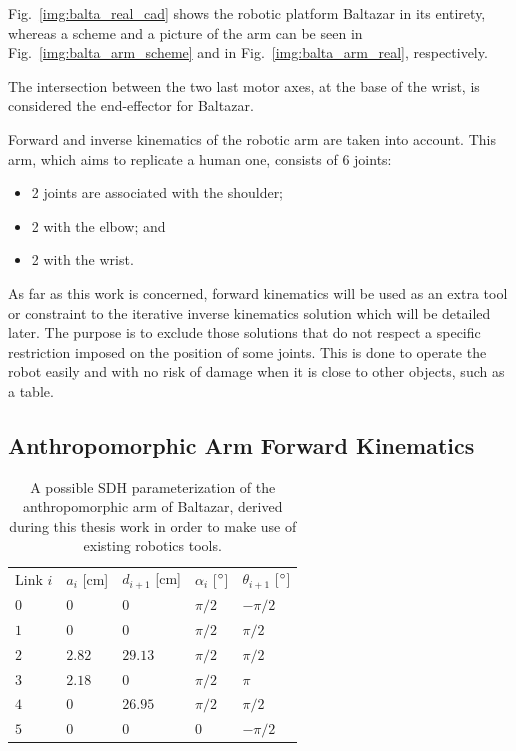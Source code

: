 Fig.~\ref{img:balta_real_cad} shows the robotic platform Baltazar in its entirety, whereas a scheme and a picture of the arm can be seen in Fig.~\ref{img:balta_arm_scheme} and in Fig.~\ref{img:balta_arm_real}, respectively.

\label{balta_ee}
The intersection between the two last motor axes, at the base of the wrist, is considered the end-effector for Baltazar.

Forward and inverse kinematics of the robotic arm are taken into account. This arm, which aims to replicate a human one, consists of 6 joints:
\begin{itemize}
\item 2 joints are associated with the shoulder;

\item 2 with the elbow; and

\item 2 with the wrist.
\end{itemize}

As far as this work is concerned, forward kinematics will be used as an extra tool or constraint to the iterative inverse kinematics solution which will be detailed later. The purpose is to exclude those solutions that do not respect a specific restriction imposed on the position of some joints. This is done to operate the robot easily and with no risk of damage when it is close to other objects, such as a table.

\subsection{Anthropomorphic Arm Forward Kinematics}

\begin{table}
\caption[\acs{SDH} parameters of Baltazar anthropomorphic arm]{A possible \ac{SDH} parameterization of the anthropomorphic arm of Baltazar, derived during this thesis work in order to make use of existing robotics tools.}
\label{tab:balta_arm_sdh}
\centering
\medskip
\begin{tabular}{*{5}{l}} %
\toprule
Link $i$ & $a_i$ [cm] & $d_{i+1}$ [cm] & $\alpha_i$ [$^\circ$] & $\theta_{i+1}$ [$^\circ$] \\
\otoprule
$0$ & $0$ & $0$ & $\pi/2$ & $-\pi/2$ \\
\midrule
$1$ & $0$ & $0$ & $\pi/2$ & $\pi/2$ \\
\midrule
$2$ & $2.82$ & $29.13$ & $\pi/2$ & $\pi/2$ \\
\midrule
$3$ & $2.18$ & $0$ & $\pi/2$ & $\pi$ \\
\midrule
$4$ & $0$ & $26.95$ & $\pi/2$ & $\pi/2$ \\
\midrule
$5$ & $0$ & $0$ & $0$ & $-\pi/2$ \\
\bottomrule
\end{tabular}
\end{table}

